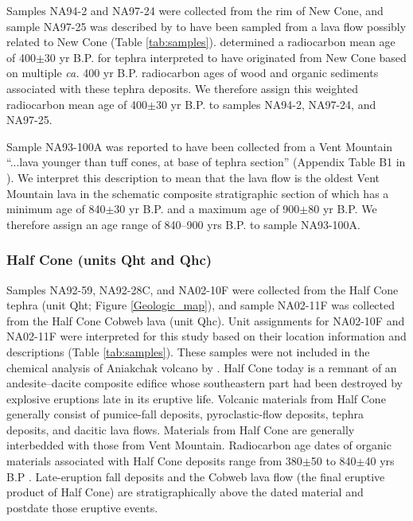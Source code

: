 \documentclass[draft]{agujournal2019}
\begin{document}
Samples NA94-2 and NA97-24 were collected from the rim of New Cone, and sample NA97-25 was described by  to have been sampled from a lava flow possibly related to New Cone (Table \ref{tab:samples}).  determined a radiocarbon mean age of 400$\pm$30 yr B.P. for tephra interpreted to have originated from New Cone based on multiple \textit{ca.} 400 yr B.P. radiocarbon ages of wood and organic sediments associated with these tephra deposits. We therefore assign this weighted radiocarbon mean age of 400$\pm$30 yr B.P. to samples NA94-2, NA97-24, and NA97-25.

Sample NA93-100A was reported to have been collected from a Vent Mountain ``...lava younger than tuff cones, at base of tephra section'' (Appendix Table B1 in ). We interpret this description to mean that the lava flow is the oldest Vent Mountain lava in the schematic composite stratigraphic section of  which has a minimum age of 840$\pm$30 yr B.P. and a maximum age of 900$\pm$80 yr B.P. We therefore assign an age range of 840–900 yrs B.P. to sample NA93-100A.

\subsubsection{Half Cone (units Qht and Qhc)}
Samples NA92-59, NA92-28C, and NA02-10F were collected from the Half Cone tephra (unit Qht; Figure \ref{Geologic_map}), and sample NA02-11F was collected from the Half Cone Cobweb lava (unit Qhc). Unit assignments for NA02-10F and NA02-11F were interpreted for this study based on their location information and descriptions (Table \ref{tab:samples}). These samples were not included in the chemical analysis of Aniakchak volcano by . Half Cone today is a remnant of an andesite–dacite composite edifice whose southeastern part had been destroyed by explosive eruptions late in its eruptive life. Volcanic materials from Half Cone generally consist of pumice-fall deposits, pyroclastic-flow deposits, tephra deposits, and dacitic lava flows. Materials from Half Cone are generally interbedded with those from Vent Mountain. Radiocarbon age dates of organic materials associated with Half Cone deposits range from 380$\pm$50 to 840$\pm$40 yrs B.P \cite{Bacon2014a}. Late-eruption fall deposits and the Cobweb lava flow (the final eruptive product of Half Cone) are stratigraphically above the dated material and postdate those eruptive events.
\end{document}
